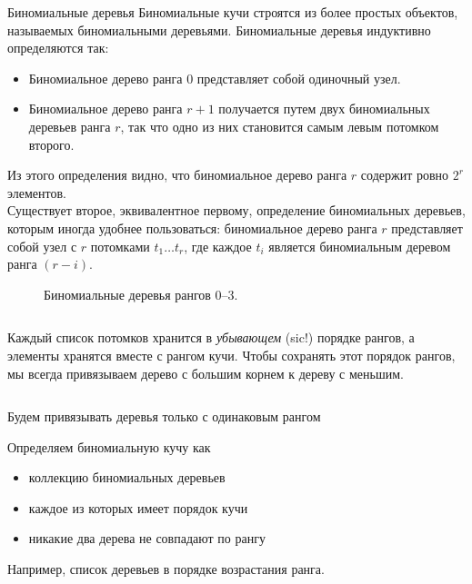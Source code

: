\begin{frame}{Биномиальные деревья}
Биномиальные кучи строятся из более простых объектов, называемых
биномиальными деревьями. Биномиальные деревья индуктивно определяются
так:
\begin{itemize}
  \item Биномиальное дерево ранга 0 представляет собой одиночный узел.
  \item Биномиальное дерево ранга $r+1$ получается путем
   двух биномиальных деревьев ранга $r$, так
  что одно из них становится самым левым потомком второго.
\end{itemize}
Из этого определения видно, что биномиальное дерево ранга $r$ содержит
ровно $2^r$ элементов.  \\

Существует второе, эквивалентное первому,
определение биномиальных деревьев, которым иногда удобнее
пользоваться: биномиальное дерево ранга $r$ представляет собой узел
с $r$ потомками $t_1\ldots t_r$, где каждое $t_i$ является
биномиальным деревом ранга $(r-i)$.
\end{frame}


\begin{frame}[fragile]{}
\begin{figure}[h]
  \centering
  
  \caption{Биномиальные деревья рангов 0--3.}
  \label{fig:3.3}
\end{figure}


\end{frame}


\begin{frame}[fragile]{}
\inputminted[firstline=5, lastline=5] {haskell}{code/BinomialHeap.lhs}

Каждый список потомков хранится в \emph{убывающем} (sic!) порядке рангов, а элементы
хранятся вместе с рангом кучи.  Чтобы сохранять этот порядок рангов, мы всегда
привязываем дерево с большим корнем к дереву с меньшим.

\inputminted[firstline=11, lastline=15] {haskell}{code/BinomialHeap.lhs}

Будем привязывать деревья только с одинаковым рангом
\end{frame}


\begin{frame}[fragile]{}
Определяем биномиальную кучу как 
\begin{itemize}
  \item коллекцию биномиальных деревьев
  \item каждое из которых имеет порядок кучи
  \item никакие два дерева не совпадают по рангу
\end{itemize} 

Например, список деревьев в порядке возрастания ранга.
\inputminted[firstline=6, lastline=6] {haskell}{code/BinomialHeap.lhs}
\end{frame}


